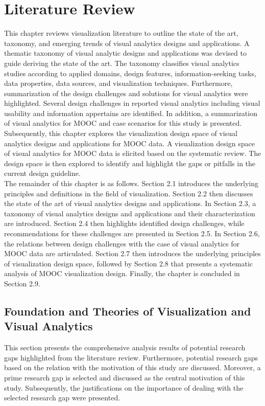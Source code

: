 
\chapter{Literature Review}

This chapter reviews visualization literature to outline the state of the art, taxonomy, and emerging trends of visual analytics designs and applications. A thematic taxonomy of visual analytic designs and applications was devised to guide deriving the state of the art. The taxonomy classifies visual analytics studies according to applied domains, design features, information-seeking tasks, data properties, data sources, and visualization techniques. Furthermore, summarization of the design challenges and solutions for visual analytics were highlighted. Several design challenges in reported visual analytics including visual usability and information appertains are identified. In addition, a summarization of visual analytics for MOOC and case scenarios for this study is presented. Subsequently, this chapter explores the visualization design space of visual analytics designs and applications for MOOC data. A visualization design space of visual analytics for MOOC data is elicited based on the systematic review. The design space is then explored to identify and highlight the gaps or pitfalls in the current design guideline.
\\[\baselineskip]\indent
The remainder of this chapter is as follows. Section 2.1 introduces the underlying principles and definitions in the field of visualization. Section 2.2 then discusses the state of the art of visual analytics designs and applications. In Section 2.3, a taxonomy of visual analytics designs and applications and their characterization are introduced. Section 2.4 then highlights identified design challenges, while recommendations for these challenges are presented in Section 2.5. In Section 2.6, the relations between design challenges with the case of visual analytics for MOOC data are articulated. Section 2.7 then introduces the underlying principles of visualization design space, followed by Section 2.8 that presents a systematic analysis of MOOC visualization design. Finally, the chapter is concluded in Section 2.9.


\section{Foundation and Theories of Visualization and Visual Analytics}
This section presents the comprehensive analysis results of potential research gaps highlighted from the literature review. Furthermore, potential research gaps based on the relation with the motivation of this study are discussed. Moreover, a prime research gap is selected and discussed as the central motivation of this study. Subsequently, the justifications on the importance of dealing with the selected research gap were presented.

